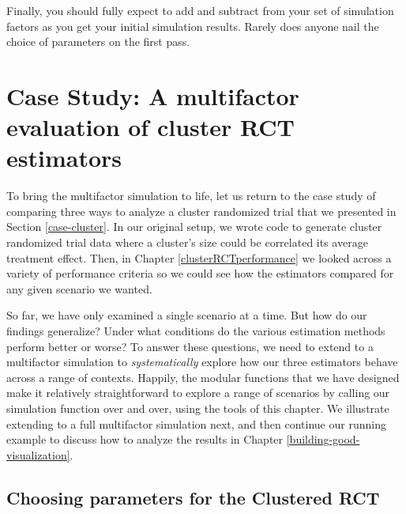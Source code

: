 \documentclass[
]{book}
\begin{document}
Finally, you should fully expect to add and subtract from your set of simulation factors as you get your initial simulation results. Rarely does anyone nail the choice of parameters on the first pass.

\section{Case Study: A multifactor evaluation of cluster RCT estimators}\label{case-study-a-multifactor-evaluation-of-cluster-rct-estimators}

To bring the multifactor simulation to life, let us return to the case study of comparing three ways to analyze a cluster randomized trial that we presented in Section \ref{case-cluster}.
In our original setup, we wrote code to generate cluster randomized trial data where a cluster's size could be correlated its average treatment effect.
Then, in Chapter \ref{clusterRCTperformance} we looked across a variety of performance criteria so we could see how the estimators compared for any given scenario we wanted.

So far, we have only examined a single scenario at a time.
But how do our findings generalize? Under what conditions do the various estimation methods perform better or worse?
To answer these questions, we need to extend to a multifactor simulation to \emph{systematically} explore how our three estimators behave across a range of contexts.
Happily, the modular functions that we have designed make it relatively straightforward to explore a range of scenarios by calling our simulation function over and over, using the tools of this chapter.
We illustrate extending to a full multifactor simulation next, and then continue our running example to discuss how to analyze the results in Chapter \ref{building-good-visualization}.

\subsection{Choosing parameters for the Clustered RCT}\label{choosing-parameters-for-the-clustered-rct}
\end{document}
